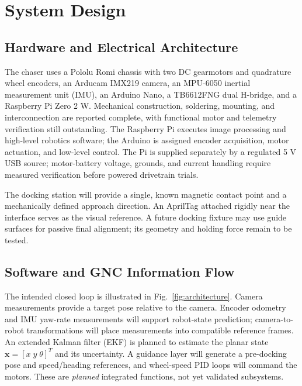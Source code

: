 \documentclass[conference,letterpaper,10pt]{IEEEtran}
\begin{document}
\section{System Design}
\subsection{Hardware and Electrical Architecture}
The chaser uses a Pololu Romi chassis with two DC gearmotors and quadrature wheel encoders, an Arducam IMX219 camera, an MPU-6050 inertial measurement unit (IMU), an Arduino Nano, a TB6612FNG dual H-bridge, and a Raspberry Pi Zero 2 W. Mechanical construction, soldering, mounting, and interconnection are reported complete, with functional motor and telemetry verification still outstanding. The Raspberry Pi executes image processing and high-level robotics software; the Arduino is assigned encoder acquisition, motor actuation, and low-level control. The Pi is supplied separately by a regulated 5 V USB source; motor-battery voltage, grounds, and current handling require measured verification before powered drivetrain trials.

The docking station will provide a single, known magnetic contact point and a mechanically defined approach direction. An AprilTag attached rigidly near the interface serves as the visual reference. A future docking fixture may use guide surfaces for passive final alignment; its geometry and holding force remain to be tested.

\subsection{Software and GNC Information Flow}
The intended closed loop is illustrated in Fig.~\ref{fig:architecture}. Camera measurements provide a target pose relative to the camera. Encoder odometry and IMU yaw-rate measurements will support robot-state prediction; camera-to-robot transformations will place measurements into compatible reference frames. An extended Kalman filter (EKF) is planned to estimate the planar state $\mathbf{x}=[x\;y\;\theta]^T$ and its uncertainty. A guidance layer will generate a pre-docking pose and speed/heading references, and wheel-speed PID loops will command the motors. These are \emph{planned} integrated functions, not yet validated subsystems.
\end{document}
